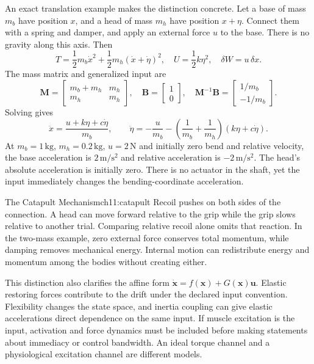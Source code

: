 An exact translation example makes the distinction concrete. Let a base of mass $m_b$ have position $x$, and a head of mass $m_h$ have position $x+\eta$. Connect them with a spring and damper, and apply an external force $u$ to the base. There is no gravity along this axis. Then
\[
T=\frac12m_b\dot x^2+\frac12m_h(\dot x+\dot\eta)^2,
\quad U=\frac12k\eta^2,\quad \delta W=u\,\delta x.
\]
The mass matrix and generalized input are
\[
\mathbf M=\begin{bmatrix}m_b+m_h&m_h\\m_h&m_h\end{bmatrix},
\quad \mathbf B=\begin{bmatrix}1\\0\end{bmatrix},
\quad \mathbf M^{-1}\mathbf B=\begin{bmatrix}1/m_b\\-1/m_b\end{bmatrix}.
\]
Solving gives
\[
\ddot x=\frac{u+k\eta+c\dot\eta}{m_b},
\qquad
\ddot\eta=-\frac{u}{m_b}
-\left(\frac1{m_b}+\frac1{m_h}\right)(k\eta+c\dot\eta).
\]
At $m_b=1\,\mathrm{kg}$, $m_h=0.2\,\mathrm{kg}$, $u=2\,\mathrm N$ and initially zero bend and relative velocity, the base acceleration is $2\,\mathrm{m/s^2}$ and relative acceleration is $-2\,\mathrm{m/s^2}$. The head's absolute acceleration is initially zero. There is no actuator in the shaft, yet the input immediately changes the bending-coordinate acceleration.

\begin{laymansbox}{The Catapult Mechanism}{ch11:catapult}
Recoil pushes on both sides of the connection. A head can move forward relative to the grip while the grip slows relative to another trial. Comparing relative recoil alone omits that reaction. In the two-mass example, zero external force conserves total momentum, while damping removes mechanical energy. Internal motion can redistribute energy and momentum among the bodies without creating either.
\end{laymansbox}

This distinction also clarifies the affine form $\dot{\mathbf x}=f(\mathbf x)+G(\mathbf x)\mathbf u$. Elastic restoring forces contribute to the drift under the declared input convention. Flexibility changes the state space, and inertia coupling can give elastic accelerations direct dependence on the same input. If muscle excitation is the input, activation and force dynamics must be included before making statements about immediacy or control bandwidth. An ideal torque channel and a physiological excitation channel are different models.

